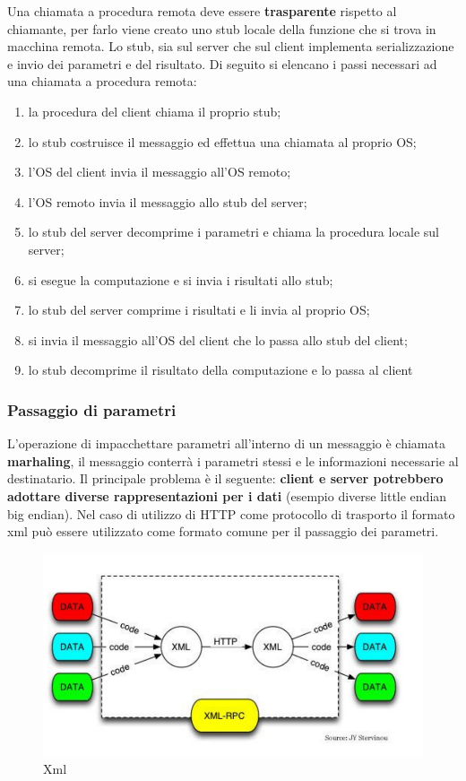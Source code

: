 \documentclass[12pt]{article}
\begin{document}
		Una chiamata a procedura remota deve essere \textbf{trasparente} rispetto al chiamante, per farlo viene creato uno stub locale della funzione che si trova in macchina remota. Lo stub, sia sul server che sul client implementa serializzazione e invio dei parametri e del risultato.  
		Di seguito si elencano i passi necessari ad una chiamata a procedura remota:
		\begin{enumerate}
			\item la procedura del client chiama il proprio stub;
			\item lo stub costruisce il messaggio ed effettua una chiamata al proprio OS;
			\item l'OS del client invia il messaggio all'OS remoto;
			\item l'OS remoto invia il messaggio allo stub del server;
			\item lo stub del server decomprime i parametri e chiama la procedura locale sul server;
			\item si esegue la computazione e si invia i risultati allo stub; 
			\item lo stub del server comprime i risultati e li invia al proprio OS;
			\item si invia il messaggio all'OS del client che lo passa allo stub del client;
			\item lo stub decomprime il risultato della computazione e lo passa al client
		\end{enumerate}
		
		\subsubsection{Passaggio di parametri}
			L'operazione di impacchettare parametri all'interno di un messaggio è chiamata \textbf{marhaling}, il messaggio conterrà i parametri stessi e le informazioni necessarie al destinatario. Il principale problema è il seguente: \textbf{client e server potrebbero adottare diverse rappresentazioni per i dati} (esempio diverse little endian big endian). Nel caso di utilizzo di HTTP come protocollo di trasporto il formato xml può essere utilizzato come formato comune per il passaggio dei parametri.
			\begin{figure}[h!]
				\centering
				\includegraphics[scale=0.50]{img/xml.png}
				\caption{Xml }
			\end{figure}
		
\end{document}
